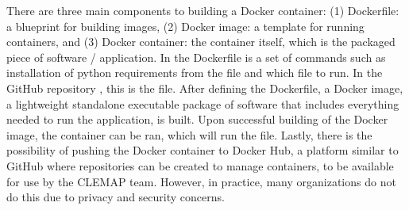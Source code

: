 There are three main components to building a Docker container: (1) Dockerfile: a blueprint for building images, (2) Docker image: a template for running containers, and (3) Docker container: the container itself, which is the packaged piece of software / application. In the Dockerfile is a set of commands such as installation of python requirements from the  file and which file to run. In the GitHub repository \cite{Stechschulte_Gaussian_Processes_for_2022}, this is the  file. After defining the Dockerfile, a Docker image, a lightweight standalone executable package of software that includes everything needed to run the application, is built. Upon successful building of the Docker image, the container can be ran, which will run the  file. Lastly, there is the possibility of pushing the Docker container to Docker Hub, a platform similar to GitHub where repositories can be created to manage containers, to be available for use by the CLEMAP team. However, in practice, many organizations do not do this due to privacy and security concerns.